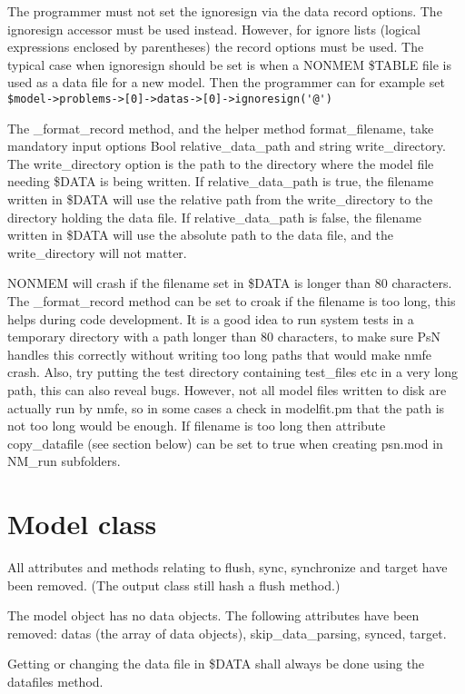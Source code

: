 The programmer must not set the ignoresign via the data record options. The ignoresign accessor must be used instead. However,
for ignore lists (logical expressions enclosed by parentheses) the record options must be used.
The typical case when ignoresign should be set is when a NONMEM \$TABLE file is used as a data file for 
a new model. Then the programmer can for example set \verb|$model->problems->[0]->datas->[0]->ignoresign('@')|

The \_format\_record method, and the helper method format\_filename, take mandatory input options Bool relative\_data\_path and
string write\_directory. 
The write\_directory option is the path to the directory where the model file needing \$DATA is being written.
If relative\_data\_path is true, the filename written in \$DATA will use the relative path from the write\_directory to the
directory holding the data file. If relative\_data\_path is false, the filename written in \$DATA will use the absolute
path to the data file, and the write\_directory will not matter.

NONMEM will crash if the filename set in \$DATA is longer than 80 characters. The \_format\_record method can
be set to croak if the filename is too long, this helps during code development. It is a good idea to run system tests in
a temporary directory with a path longer than 80 characters, to make sure PsN handles this correctly without
writing too long paths that would make nmfe crash. Also, try putting the test directory containing test\_files
etc in a very long path, this can also reveal bugs.
However, not all model files written to disk are actually run by nmfe, so in some cases
a check in modelfit.pm that the path is not too long would be enough. 
If filename is too long then attribute copy\_datafile (see section below) can be set to true when creating psn.mod in NM\_run
subfolders.

\section{Model class}

All attributes and methods relating to flush, sync, synchronize and target have been removed. (The output class still hash a flush method.)

The model object has no data objects. 
The following attributes have been removed: datas (the array of data objects), skip\_data\_parsing, synced, target.

Getting or changing the data file in \$DATA shall always be done using the datafiles method.

